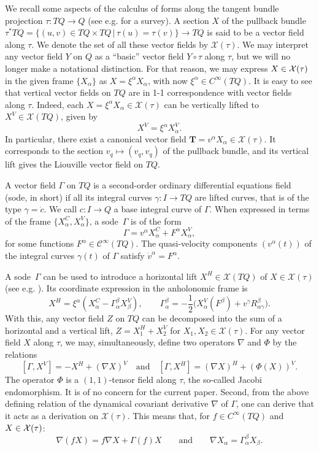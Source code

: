 \documentclass[11pt]{article}
\def\cinfty#1{C^{\scriptscriptstyle\infty}(#1)}
\def\vectorfields#1{{\cal X}(#1)}
\def\sode{{\sc sode}}
\def\T{{\mathbf T}}
\begin{document}
We recall some aspects of the calculus of forms along the tangent bundle projection $\tau:TQ\rightarrow Q$ (see e.g. \cite{derII,Willysurvey} for a survey). 
A section $X$ of the pullback bundle $\tau^* TQ=\{(u,v)\in TQ\times TQ\,|\, \tau(u)=\tau(v)\} \to TQ$ is said to be a vector field along $\tau$. We denote the set of all these vector fields by $\mathcal{X}(\tau)$. We may interpret any vector field $Y$ on $Q$ as a ``basic'' vector field $Y\circ\tau$ along $\tau$, but we will no longer make a notational distinction. For that reason, we may express $X\in \vectorfields{\tau}$ in the given frame $\{X_\alpha\}$ as  
$X=\xi^\alpha X_\alpha$, with   now  $\xi^\alpha \in \cinfty{TQ}$.
It is easy to see that vertical vector fields on $TQ$ are in 1-1 correspondence with vector fields along $\tau$. Indeed, each $X=\xi^\alpha X_\alpha\in\mathcal{X}(\tau)$ can be vertically lifted to $X^V\in\mathcal{X}(TQ)$, given by 
$$
X^V=\xi^\alpha X_\alpha^V.
$$ 
In particular, there exist a canonical vector field $\T = v^\alpha X_\alpha\in\mathcal{X}(\tau)$. It  corresponds to the section $v_q\mapsto (v_q,v_q)$ of the pullback bundle, and its   vertical lift  gives the Liouville vector field on $TQ$.

  A vector field $\Gamma$ on $TQ$ is a second-order ordinary differential equations field (\sode, in short) if all its integral curves $\gamma: I\rightarrow TQ$ are lifted curves, that is of the type $\gamma=\dot{c}$. We   call  $c:I\rightarrow Q$ a base integral curve of $\Gamma$.  
When expressed  in terms of the frame $\{X_\alpha^C,X_\alpha^V\}$, a \sode\ $\Gamma$ is of the form 
$$
\Gamma=v^\alpha X_\alpha^C+F^\alpha X_\alpha^V,
$$
for some functions $F^\alpha\in\mathcal{C}^\infty(TQ)$. The quasi-velocity components $(v^\alpha(t))$ of the integral curves $\gamma(t)$ of $\Gamma$ satisfy
$\dot{v}^\alpha=F^\alpha $.


A \sode\ $\Gamma$ can be used to introduce a horizontal lift $X^H\in\mathcal{X}(TQ)$ of  $X\in\mathcal{X}(\tau)$ (see e.g. \cite{derII,Willysurvey}). Its coordinate expression in the anholonomic frame is
$$
X^H=\xi^\alpha \left(X_\alpha^C-\Gamma^\beta_\alpha X_\beta^V \right),\quad\quad \Gamma^\beta_\alpha=-\frac{1}{2} \Big( X_\alpha^V(F^\beta) + v^\gamma R^\beta_{\alpha\gamma}\Big) .
$$
With this, any vector field $Z$ on $TQ$ can be decomposed into the sum of a horizontal and a vertical lift,  $Z=X_1^H+X_2^V$ for $X_1,X_2\in\mathcal{X}(\tau)$. For any vector field $X$ along $\tau$, we may, simultaneously, define  two operators $\nabla$ and $\Phi$ by the relations  
$$
[\Gamma, X^V]=-X^H+(\nabla X)^V\quad\text{and}\quad [\Gamma,X^H]=(\nabla X)^H+(\Phi(X))^V.
$$
 The operator $\Phi$ is a  $(1,1)$-tensor field along $\tau$, the so-called Jacobi endomorphism. It is of no concern for the current paper. Second, from the above defining relation of the dynamical covariant derivative $\nabla$ of $\Gamma$, one can derive that it acts  as a derivation on $\mathcal{X}(\tau)$. This means that, for $f\in\cinfty{TQ}$ and $X\in\vectorfields{\tau}$:
$$
\nabla(fX)=f\nabla X+\Gamma(f)X\quad\quad\text{and}\quad\quad \nabla X_\alpha=\Gamma^\beta_\alpha X_\beta.
$$
\end{document}

